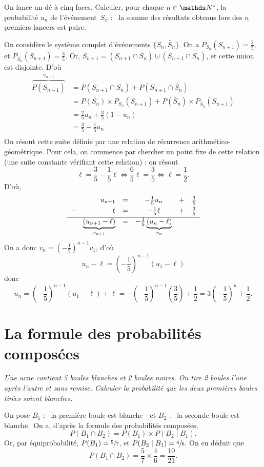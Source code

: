 \begin{exo}
	On lance un dé à cinq faces. Calculer, pour chaque $n \in \N^*$, la probabilité $u_n$ de l'événement~$S_n$ : \guillemotleft~la somme des résultats obtenus lors des $n$ premiers lancers est paire.~\guillemotright

	On considère le système complet d'événements $\{S_n, \bar{S}_n\}$. On a $P_{S_n}(S_{n+1}) = \frac{2}{5}$, et $P_{\bar{S}_n}(S_{n+1}) = \frac{3}{5}$. Or, $S_{n+1} = (S_{n+1} \cap S_n) \cupdot (S_{n+1} \cap \bar{S}_n)$, et cette union est disjointe. D'où
	\begin{align*}
		\overbrace{P(S_{n+1})}^{u_{n+1}} &= P(S_{n+1} \cap S_n) + P(S_{n+1} \cap \bar{S}_n)\\
		&= P(S_n) \times P_{S_n}(S_{n+1}) + P(\bar{S}_n) \times P_{\bar{S}_n}(S_{n+1}) \\
		&= \frac{2}{5} u_n + \frac{3}{5} (1 - u_n) \\
		&= \frac{3}{5} - \frac{1}{5} u_n \\
	\end{align*}
	On résout cette suite définie par une relation de récurrence arithmético-géométrique. Pour cela, on commence par chercher un point fixe de cette relation (une suite constante vérifiant cette relation) : on résout
	\[
		\ell = \frac{3}{5} - \frac{1}{5}\ell \iff \frac{6}{5}\ell = \frac{3}{5} \iff \ell = \frac{1}{2}
	.\]
	D'où,
	\[
		\begin{array}{r r c c c c}
			&u_{n+1} & = & -\frac{1}{5} u_n & + & \frac{3}{5} \\[1mm]
			-&\ell & = & -\frac{1}{5} \ell & + & \frac{3}{5} \\[1mm] \hline
			 & \underbrace{(u_{n+1} - \ell)}_{v_{n+1}} &=& -\frac{1}{5} \underbrace{(u_n - \ell)}_{v_n}
		\end{array}
	\] On a donc $v_n = \left( -\frac{1}{5} \right)^{n-1} v_1$, d'où \[
		u_n - \ell = \left( -\frac{1}{5} \right)^{n-1} (u_1 - \ell)
	\] donc \[
		u_n = \left( -\frac{1}{5} \right)^{n-1} (u_1 - \ell) + \ell = -\left( -\frac{1}{5} \right)^{n-1} \left( \frac{3}{5} \right) + \frac{1}{2} = 3 \left( -\frac{1}{5} \right)^{n} + \frac{1}{2}
	.\]
\end{exo}

\section{La formule des probabilités composées}

\begin{exo}
	\textsl{Une urne contient 5 boules blanches et 2 boules noires. On tire 2 boules l'une après l'autre et sans remise. Calculer la probabilité que les deux premières boules tirées soient blanches.}

	On pose $B_1$\/ : \guillemotleft~la première boule est blanche~\guillemotright\ et $B_2$\/ : \guillemotleft~la seconde boule est blanche.~\guillemotright\@ On a, d'après la formule des probabilités composées, \[
		P(B_1 \cap B_2) = P(B_1) \times P(B_2  \mid B_1)
	.\]
	Or, par équiprobabilité, $P(B_1) = \sfrac{5}{7}$, et $P(B_2  \mid B_1) = \sfrac{4}{6}$. On en déduit que \[
		P(B_1 \cap B_2) = \frac{5}{7} \times \frac{4}{6} = \frac{10}{21}
	.\]
\end{exo}

